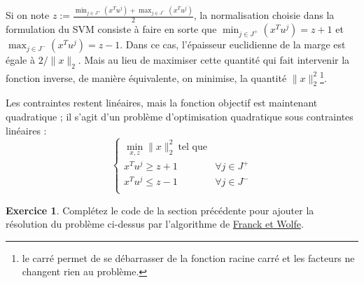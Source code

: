 \documentclass[a4paper,francais]{article}
\theoremstyle{definition}
\newtheorem{exercice}{Exercice}[section]
\begin{document}
Si on note $z := \frac{\min_{j \in J^+} (x^T u^j) + \max_{j \in J^-} (x^T u^j)}{2}$,
la normalisation choisie dans la formulation du SVM consiste à faire
en sorte que $\min_{j \in J^+} (x^T u^j) = z + 1$ et
$\max_{j \in J^-} (x^T u^j) = z - 1$.
Dans ce cas, l'épaisseur euclidienne de la marge est égale à $2/\|x\|_2$.
Mais au lieu de maximiser cette quantité qui fait intervenir la fonction inverse,
de manière équivalente, on minimise, la quantité $\|x\|_2^2$\footnote{
  le carré permet de se débarrasser de la fonction racine carré et
  les facteurs ne changent rien au problème.}.

Les contraintes restent linéaires, mais la fonction objectif est maintenant
quadratique ; il s'agit d'un problème d'optimisation quadratique sous contraintes
linéaires : 
\[
\left\{
\begin{array}{ll}
  \min_{x,z} \|x\|_2^2 \ \text{tel que} & \\
  x^T u^j \geq z + 1 & \forall j \in J^+ \\ 
  x^T u^j \leq z - 1 & \forall j \in J^- \\
\end{array}
\right.
\]

\begin{exercice}
  Complétez le code de la section précédente pour ajouter la résolution du problème
  ci-dessus par l'algorithme de
  \href{https://en.wikipedia.org/wiki/Frank%E2%80%93Wolfe_algorithm}{Franck et Wolfe}. 
\end{exercice}
\end{document}
